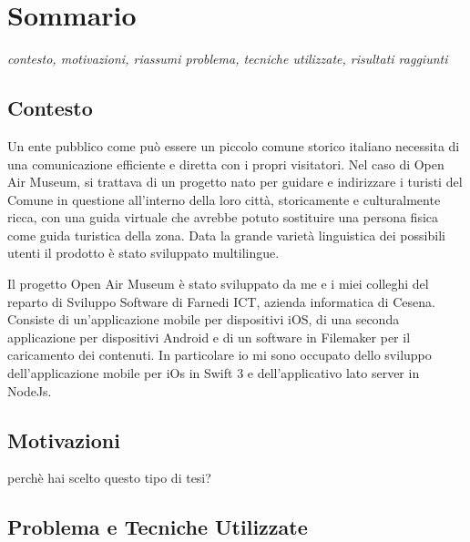 \chapter*{Sommario} %
\label{sommario}

\vspace{5mm}

\emph{contesto, motivazioni, riassumi problema, tecniche utilizzate, risultati raggiunti} \vspace{5mm}

\section{Contesto}\vspace{5mm}

Un ente pubblico come può essere un piccolo comune storico italiano necessita di una comunicazione efficiente e diretta con i propri visitatori. Nel caso di Open Air Museum, si trattava di un progetto nato per guidare e indirizzare i turisti del Comune in questione all’interno della loro città, storicamente e culturalmente ricca, con una guida virtuale che avrebbe potuto sostituire una persona fisica come guida turistica della zona. Data la grande varietà linguistica dei possibili utenti il prodotto è stato sviluppato multilingue.\vspace{5mm}

Il progetto Open Air Museum è stato sviluppato da me e i miei colleghi del reparto di Sviluppo Software di Farnedi ICT, azienda informatica di Cesena. Consiste di un’applicazione mobile per dispositivi iOS, di una seconda applicazione per dispositivi Android e di un software in Filemaker per il caricamento dei contenuti. In particolare io mi sono occupato dello sviluppo dell’applicazione mobile per iOs in Swift 3 e dell’applicativo lato server in NodeJs.\vspace{5mm}

\section{Motivazioni}\vspace{5mm}

perchè hai scelto questo tipo di tesi?

\section{Problema e Tecniche Utilizzate}\vspace{5mm}

